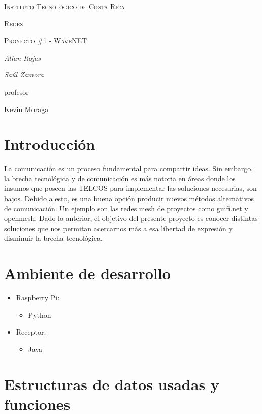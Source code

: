 \documentclass{article}
\begin{document}
\begin{titlepage}
  \centering
  {\scshape\LARGE Instituto Tecnol\'ogico de Costa Rica \par}
  \vspace{1cm}
  {\scshape\Large Redes\par}
  {\scshape\Large Proyecto \#1 - WaveNET\par}
  \vspace{1.5cm}
  {\Large\itshape Allan Rojas\par}
  {\Large\itshape Sa\'ul Zamora\par}
  \vfill
  profesor\par
  Kevin Moraga \textsc{}

  \vfill

\end{titlepage}

\section{Introducci\'on}
La comunicaci\'on es un proceso fundamental para compartir ideas. Sin embargo, la brecha tecnol\'ogica y de comunicaci\'on es m\'as notoria en \'areas donde los insumos que poseen las TELCOS para implementar las soluciones necesarias, son bajos.
Debido a esto, es una buena opci\'on producir nuevos m\'etodos alternativos de comunicaci\'on. Un ejemplo son las redes mesh de proyectos como guifi.net y openmesh.
Dado lo anterior, el objetivo del presente proyecto es conocer distintas soluciones que nos permitan acercarnos m\'as a esa libertad de expresi\'on y disminuir la brecha tecnol\'ogica.

\section{Ambiente de desarrollo}
\begin{itemize}
  \item Raspberry Pi:
  \begin{itemize}
    \item Python
  \end{itemize}
  \item Receptor:
  \begin{itemize}
    \item Java
  \end{itemize}
\end{itemize}

\section{Estructuras de datos usadas y funciones}
\end{document}
